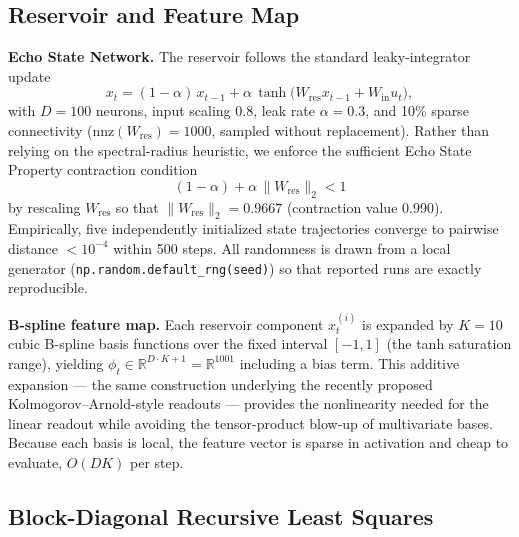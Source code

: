 \documentclass[11pt]{article}
\begin{document}
\subsection{Reservoir and Feature Map}\label{reservoir-and-feature-map}

\textbf{Echo State Network.} The reservoir follows the standard leaky-integrator
update
\[
x_t = (1-\alpha)\,x_{t-1} + \alpha\,\tanh\!\big(W_{\mathrm{res}}x_{t-1} + W_{\mathrm{in}}u_t\big),
\]
with \(D=100\) neurons, input scaling 0.8, leak rate \(\alpha=0.3\), and
10\% sparse connectivity (\(\mathrm{nnz}(W_{\mathrm{res}})=1000\), sampled
without replacement). Rather than relying on the spectral-radius
heuristic, we enforce the sufficient Echo State Property contraction
condition
\[
(1-\alpha) + \alpha\,\|W_{\mathrm{res}}\|_2 < 1
\]
by rescaling \(W_{\mathrm{res}}\) so that \(\|W_{\mathrm{res}}\|_2 = 0.9667\)
(contraction value 0.990). Empirically, five independently initialized
state trajectories converge to pairwise distance \(<10^{-4}\) within
500 steps.
All randomness is drawn from a local generator
(\texttt{np.random.default\_rng(seed)}) so that reported runs are exactly
reproducible.

\textbf{B-spline feature map.} Each reservoir component \(x_t^{(i)}\) is expanded
by \(K=10\) cubic B-spline basis functions over the fixed interval
\([-1,1]\) (the tanh saturation range), yielding \(\phi_t \in
\mathbb{R}^{D\cdot K + 1} = \mathbb{R}^{1001}\) including a bias term.
This additive expansion --- the same construction underlying the recently
proposed Kolmogorov--Arnold-style readouts --- provides the nonlinearity
needed for the linear readout while avoiding the tensor-product blow-up
of multivariate bases. Because each basis is local, the feature vector
is sparse in activation and cheap to evaluate, \(O(D K)\) per step.

\subsection{Block-Diagonal Recursive Least Squares}\label{block-diagonal-recursive-least-squares}
\end{document}
